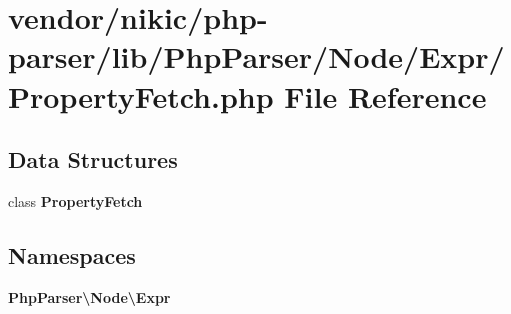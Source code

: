 \section{vendor/nikic/php-\/parser/lib/\+Php\+Parser/\+Node/\+Expr/\+Property\+Fetch.php File Reference}
\label{_property_fetch_8php}
\subsection*{Data Structures}
\begin{DoxyCompactItemize}
\item 
class {\bf Property\+Fetch}
\end{DoxyCompactItemize}
\subsection*{Namespaces}
\begin{DoxyCompactItemize}
\item 
 {\bf Php\+Parser\textbackslash{}\+Node\textbackslash{}\+Expr}
\end{DoxyCompactItemize}

